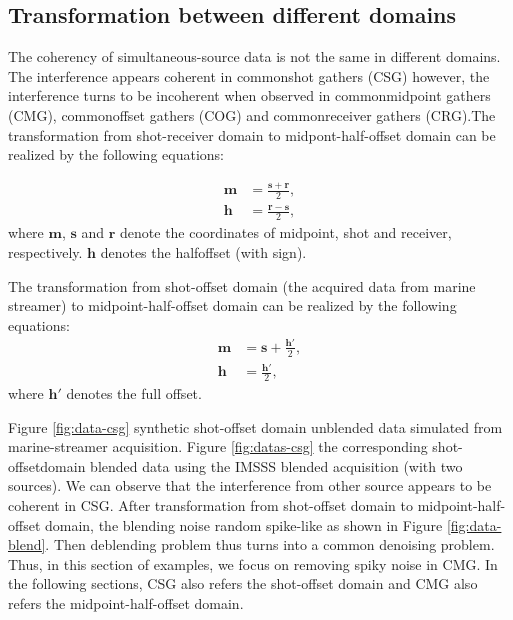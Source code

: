 \subsection{Transformation between different domains}
The coherency of  simultaneous-source data is not the same in different domains. The interference appears coherent in common\new{-}shot gathers (CSG)\old{,}\new{;} however, the interference turns  to be incoherent when observed in common\new{-}midpoint gathers (CMG), common\new{-}offset gathers (COG) and common\new{-}receiver gathers (CRG).The transformation from shot-receiver domain to midpont-half-offset domain can be realized by the following equations:

\begin{align}
\label{eq:trans1}
\mathbf{m} &= \frac{\mathbf{s}+\mathbf{r}}{2}, \\
\mathbf{h} &= \frac{\mathbf{r}-\mathbf{s}}{2},
\end{align}
where $\mathbf{m}$, $\mathbf{s}$ and $\mathbf{r}$ denote the coordinates of midpoint, shot\new{,} and receiver, respectively. $\mathbf{h}$ denotes the half\new{-}offset (with sign).

The transformation from shot-offset domain (the acquired data from marine streamer) to midpoint-half-offset domain can be realized by the following equations:
\begin{align}
\label{eq:trans2}
\mathbf{m} &= \mathbf{s}+\frac{\mathbf{h}'}{2}, \\
\mathbf{h} &= \frac{\mathbf{h}'}{2},
\end{align}
where $\mathbf{h}'$ denotes the full offset.

Figure \ref{fig:data-csg}  synthetic shot-offset domain unblended data simulated from marine-streamer acquisition. Figure \ref{fig:datas-csg}  the corresponding shot-offset\new{-}domain blended data using the IMSSS blended acquisition (with two sources). We can observe that the interference from  other source appears to be coherent in CSG. After transformation from  shot-offset domain to  midpoint-half-offset domain, the blending noise  random  spike-like\new{,} as shown in Figure \ref{fig:data-blend}. Then deblending problem thus turns into a common denoising problem. Thus, in this section of examples, we focus on removing spiky noise in CMG. In the following sections, CSG also refers  the shot-offset domain and CMG also refers  the midpoint-half-offset domain. 

